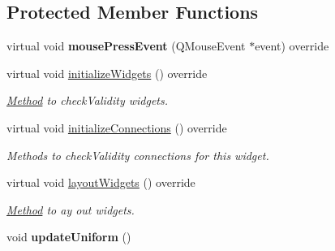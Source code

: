 \subsection*{Protected Member Functions}
\begin{DoxyCompactItemize}
\item 
\mbox{\label{classrev_1_1_view_1_1_uniform_widget_aea966874ad6442d172418c5fdfb0ab33}} 
virtual void {\bfseries mouse\+Press\+Event} (Q\+Mouse\+Event $\ast$event) override
\item 
\mbox{\label{classrev_1_1_view_1_1_uniform_widget_a17ade2a9580bdcc26182a32753b300ec}} 
virtual void \mbox{\hyperlink{classrev_1_1_view_1_1_uniform_widget_a17ade2a9580bdcc26182a32753b300ec}{initialize\+Widgets}} () override
\begin{DoxyCompactList}\small\item\em \mbox{\hyperlink{struct_method}{Method}} to check\+Validity widgets. \end{DoxyCompactList}\item 
\mbox{\label{classrev_1_1_view_1_1_uniform_widget_a13b6307e8210c07d3fa0ccfadfad3487}} 
virtual void \mbox{\hyperlink{classrev_1_1_view_1_1_uniform_widget_a13b6307e8210c07d3fa0ccfadfad3487}{initialize\+Connections}} () override
\begin{DoxyCompactList}\small\item\em Methods to check\+Validity connections for this widget. \end{DoxyCompactList}\item 
\mbox{\label{classrev_1_1_view_1_1_uniform_widget_a96fafa2e4eb3ef3a0ba387f5d34f629b}} 
virtual void \mbox{\hyperlink{classrev_1_1_view_1_1_uniform_widget_a96fafa2e4eb3ef3a0ba387f5d34f629b}{layout\+Widgets}} () override
\begin{DoxyCompactList}\small\item\em \mbox{\hyperlink{struct_method}{Method}} to ay out widgets. \end{DoxyCompactList}\item 
\mbox{\label{classrev_1_1_view_1_1_uniform_widget_a37e9ef7a3658abe5cfe014ddea7bb0e3}} 
void {\bfseries update\+Uniform} ()
\end{DoxyCompactItemize}

